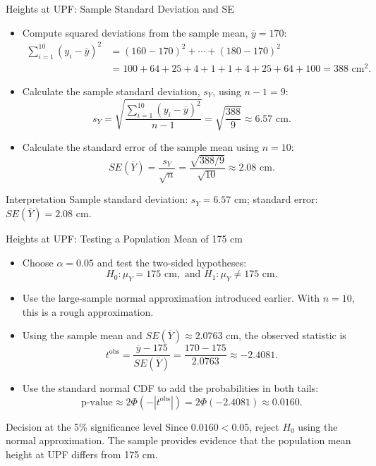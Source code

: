 \documentclass[notes,10pt, aspectratio=169]{beamer}
\begin{document}
\begin{frame}{Heights at UPF: Sample Standard Deviation and SE}
\begin{itemize}
    \item Compute squared deviations from the sample mean, $\overline{y}=170$:
    \[
    \begin{aligned}
        \sum_{i=1}^{10}(y_i-\overline{y})^2
        &=(160-170)^2+\cdots+(180-170)^2\\
        &=100+64+25+4+1+1+4+25+64+100=388\text{ cm}^2.
    \end{aligned}
    \]
    \item Calculate the sample standard deviation, $s_Y$, using $n-1=9$:
    \[
        s_Y=\sqrt{\frac{\sum_{i=1}^{10}(y_i-\overline{y})^2}{n-1}}
        =\sqrt{\frac{388}{9}}\approx 6.57\text{ cm}.
    \]
    \item Calculate the standard error of the sample mean using $n=10$:
    \[
        SE(\overline{Y})=\frac{s_Y}{\sqrt{n}}
        =\frac{\sqrt{388/9}}{\sqrt{10}}
        \approx 2.08\text{ cm}.
    \]
\end{itemize}
\begin{block}{Interpretation}
    Sample standard deviation: $s_Y=6.57$ cm; standard error: $SE(\overline{Y})=2.08$ cm.
\end{block}
\end{frame}

\begin{frame}{Heights at UPF: Testing a Population Mean of 175 cm}
\begin{itemize}
    \item Choose $\alpha=0.05$ and test the two-sided hypotheses:
    \[
        H_0:\mu_Y=175\text{ cm},\text{ and }H_1:\mu_Y\neq175\text{ cm}.
    \]
    \item Use the large-sample normal approximation introduced earlier. With $n=10$, this is a rough approximation.
    \item Using the sample mean and $SE(\overline{Y})\approx2.0763$ cm, the observed statistic is
    \[
        t^{\mathrm{obs}}=\frac{\overline{y}-175}{SE(\overline{Y})}
        =\frac{170-175}{2.0763}
        \approx -2.4081.
    \]
    \item Use the standard normal CDF to add the probabilities in both tails:
    \[
        \text{p-value}\approx 2\Phi\!\left(-|t^{\mathrm{obs}}|\right)
        =2\Phi(-2.4081)\approx 0.0160.
    \]
\end{itemize}
\begin{block}{Decision at the 5\% significance level}
    Since $0.0160<0.05$, reject $H_0$ using the normal approximation. The sample provides evidence that the population mean height at UPF differs from 175 cm.
\end{block}
\end{frame}
\end{document}
